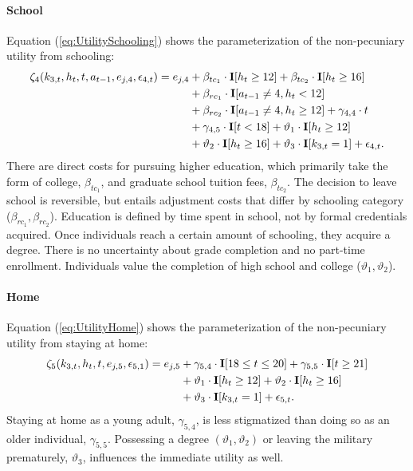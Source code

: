 \paragraph{School}
Equation (\ref{eq:UtilitySchooling}) shows the parameterization of the non-pecuniary utility from schooling:
%
\begin{align}\label{eq:UtilitySchooling}
	\zeta_4(k_{3,t}, h_t, t, a_{t-1}, e_{j,4}, \epsilon_{4,t})  = e_{j,4} & + \beta_{tc_1} \cdot {\textbf{I}}[h_t \geq 12] + \beta_{tc_2} \cdot {\textbf{I}}[h_t \geq 16]   \\\nonumber
    							  & + \beta_{rc_1} \cdot {\textbf{I}}[a_{t-1} \neq 4, h_t < 12]  \\\nonumber
    							  & + \beta_{rc_2} \cdot {\textbf{I}}[a_{t-1} \neq 4, h_t \geq 12]+ \gamma_{4,4} \cdot t  \\\nonumber
     							  & + \gamma_{4,5} \cdot {\textbf{I}}[t < 18] + \vartheta_1 \cdot {\textbf{I}}[h_t \geq 12]  \\\nonumber
      							& + \vartheta_2 \cdot {\textbf{I}}[h_t \geq 16]+ \vartheta_3 \cdot {\textbf{I}}[k_{3,t} = 1] + \epsilon_{4,t}.
\end{align}
%
There are direct costs for pursuing higher education, which primarily take the form of college, $\beta_{tc_1}$, and graduate school tuition fees, $\beta_{tc_2}$. The decision to leave school is reversible, but entails adjustment costs that differ by schooling category ($\beta_{rc_1}, \beta_{rc_2}$). Education is defined by time spent in school, not by formal credentials acquired. Once individuals reach a certain amount of schooling, they acquire a degree. There is no uncertainty about grade completion  and no part-time enrollment. Individuals value the completion of high school and college ($\vartheta_1, \vartheta_2$).
\paragraph{Home}
Equation (\ref{eq:UtilityHome}) shows the parameterization of the non-pecuniary utility from staying at home:
%
\begin{align}\label{eq:UtilityHome}
	\zeta_5(k_{3,t}, h_t, t, e_{j,5}, \epsilon_{5,1}) =  e_{j,5} & + \gamma_{5,4} \cdot {\textbf{I}}[18 \leq t \leq 20] + \gamma_{5,5} \cdot {\textbf{I}}[t \geq 21] \\ \nonumber
    							   & +\vartheta_{1} \cdot {\textbf{I}}[h_t \geq 12] + \vartheta_{2} \cdot {\textbf{I}}[h_t \geq 16] \\ \nonumber
    							   & +  \vartheta_3 \cdot {\textbf{I}}[k_{3,t} = 1]+ \epsilon_{5,t}.
\end{align}
%
Staying at home as a young adult, $\gamma_{5, 4}$, is less stigmatized than doing so as an older individual, $\gamma_{5,5}$. Possessing a degree $(\vartheta_1, \vartheta_2)$ or leaving the military prematurely, $\vartheta_3$, influences the immediate utility as well.
